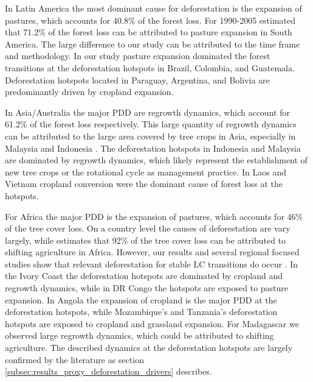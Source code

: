 		In Latin America the most dominant cause for deforestation is the expansion of pastures, which accounts for 40.8\% of the forest loss. For 1990-2005 \citet{Sy2015} estimated that 71.2\% of the forest loss can be attributed to pasture expansion in South America. The large difference to our study can be attributed to the time frame and methodology. In our study pasture expansion dominated the forest transitions at the deforestation hotspots in Brazil, Colombia, and Guatemala. Deforestation hotspots located in Paraguay, Argentina, and Bolivia are predominantly driven by cropland expansion. 

		In Asia/Australia the major \ac{PDD} are regrowth dynamics, which account for 61.2\% of the forest loss respectively. This large quantity of regrowth dynamics can be attributed to the large area covered by tree crops in Asia, especially in Malaysia and Indonesia \citep{Corley2016,Austin2019}. The deforestation hotspots in Indonesia and Malaysia are dominated by regrowth dynamics, which likely represent the establishment of new tree crops or the rotational cycle as management practice. In Laos and Vietnam cropland conversion were the dominant cause of forest loss at the hotspots. 

		For Africa the major \ac{PDD} is the expansion of pastures, which accounts for 46\% of the tree cover loss. On a country level the causes of deforestation are vary largely, while \citet{Curtis2018} estimates that 92\% of the tree cover loss can be attributed to shifting agriculture in Africa. However, our results and several regional focused studies show that relevant deforestation for stable \ac{LC} transitions do occur \citep{Ruf2014,Kideghesho2015,Barima2016,Folefack2019}. In the Ivory Coast the deforestation hotspots are dominated by cropland and regrowth dynamics, while in DR Congo the hotspots are exposed to pasture expansion. In Angola the expansion of cropland is the major \ac{PDD} at the deforestation hotspots, while Mozambique's and Tanzania's deforestation hotspots are exposed to cropland and grassland expansion. For Madagascar we observed large regrowth dynamics, which could be attributed to shifting agriculture. The described dynamics at the deforestation hotspots are largely confirmed by the literature as section \ref{subsec:results_proxy_deforestation_drivers} describes. 

